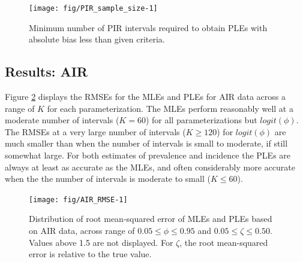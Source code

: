 \documentclass[man, noextraspace, floatsintext]{apa6}\usepackage[]{graphicx}\usepackage[]{color}
\newenvironment{knitrout}{}{} %
\begin{document}
\begin{knitrout}
\color{fgcolor}\begin{figure}[tb]

{\centering \texttt{[image: fig/PIR\_sample\_size-1]} 

}

\caption[Minimum number of PIR intervals required to obtain PLEs with absolute bias less than given criteria]{Minimum number of PIR intervals required to obtain PLEs with absolute bias less than given criteria.}\label{fig:PIR_sample_size}
\end{figure}


\end{knitrout}

\subsection{Results: AIR}
Figure \ref{fig:AIR_RMSE} displays the RMSEs for the MLEs and PLEs for AIR data across a range of $K$ for each parameterization. The MLEs perform reasonably well at a moderate number of intervals ($K = 60$) for all parameterizations but $logit(\phi)$. The RMSEs at a very large number of intervals ($K \geq 120$) for $logit(\phi)$ are much smaller than when the number of intervals is small to moderate, if still somewhat large. For both estimates of prevalence and incidence the PLEs are always at least as accurate as the MLEs, and often considerably more accurate when the the number of intervals is moderate to small ($K \leq 60$).

\begin{knitrout}
\color{fgcolor}\begin{figure}[tb]

{\centering \texttt{[image: fig/AIR\_RMSE-1]} 

}

\caption[Distribution of root mean-squared error of MLEs and PLEs based on AIR data, across range of ]{Distribution of root mean-squared error of MLEs and PLEs based on AIR data, across range of $0.05 \leq \phi \leq 0.95$ and $0.05 \leq \zeta \leq 0.50$. Values above 1.5 are not displayed. For $\zeta$, the root mean-squared error is relative to the true value.}\label{fig:AIR_RMSE}
\end{figure}


\end{knitrout}
\end{document}
